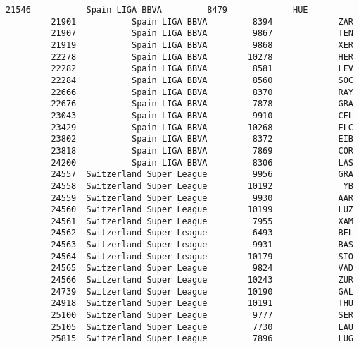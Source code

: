 \documentclass[11pt]{article}
\begin{document}
\begin{Verbatim}[commandchars=\\\{\}]
         21546           Spain LIGA BBVA         8479             HUE   
         21901           Spain LIGA BBVA         8394             ZAR   
         21907           Spain LIGA BBVA         9867             TEN   
         21919           Spain LIGA BBVA         9868             XER   
         22278           Spain LIGA BBVA        10278             HER   
         22282           Spain LIGA BBVA         8581             LEV   
         22284           Spain LIGA BBVA         8560             SOC   
         22666           Spain LIGA BBVA         8370             RAY   
         22676           Spain LIGA BBVA         7878             GRA   
         23043           Spain LIGA BBVA         9910             CEL   
         23429           Spain LIGA BBVA        10268             ELC   
         23802           Spain LIGA BBVA         8372             EIB   
         23818           Spain LIGA BBVA         7869             COR   
         24200           Spain LIGA BBVA         8306             LAS   
         24557  Switzerland Super League         9956             GRA   
         24558  Switzerland Super League        10192              YB   
         24559  Switzerland Super League         9930             AAR   
         24560  Switzerland Super League        10199             LUZ   
         24561  Switzerland Super League         7955             XAM   
         24562  Switzerland Super League         6493             BEL   
         24563  Switzerland Super League         9931             BAS   
         24564  Switzerland Super League        10179             SIO   
         24565  Switzerland Super League         9824             VAD   
         24566  Switzerland Super League        10243             ZUR   
         24739  Switzerland Super League        10190             GAL   
         24918  Switzerland Super League        10191             THU   
         25100  Switzerland Super League         9777             SER   
         25105  Switzerland Super League         7730             LAU   
         25815  Switzerland Super League         7896             LUG   
         

\end{Verbatim}
\end{document}
